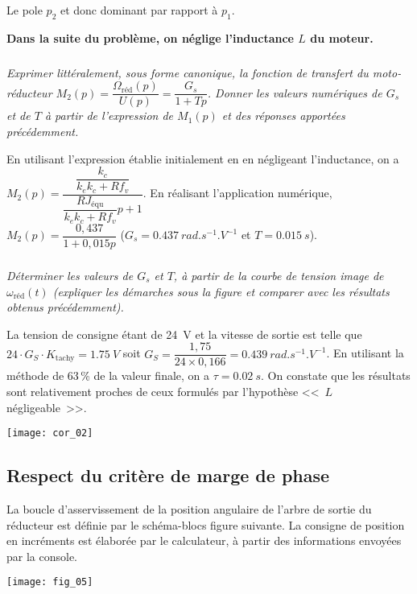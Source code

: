 \begin{multicols}{2}
\begin{corrige}
Le pole $p_2$ et donc dominant par rapport à $p_1$.
\end{corrige}
\else
\fi

\textbf{Dans la suite du problème, on néglige l’inductance $L$ du moteur.}

\subparagraph{}\textit{Exprimer littéralement, sous forme canonique, la fonction de transfert du moto-réducteur  $M_2(p)=\dfrac{\Omega_{\text{réd}}(p)}{U(p)}=\dfrac{G_s}{1+Tp}$.  
Donner les valeurs numériques de $G_s$ et de $T$ à partir de l’expression de $M_1(p)$ et des réponses apportées précédemment.}
\ifprof
\begin{corrige}
En utilisant l'expression établie initialement en en négligeant l'inductance, on a 
$  M_2(p)=\dfrac{\dfrac{k_c}{k_e k_c+Rf_v}}{  \dfrac{ RJ_{\text{équ}}  }{k_e k_c+Rf_v}p +1 }$.
En réalisant l'application numérique, $M_2(p)=\dfrac{0,437}{1+0,015p}$ 
($G_s = \SI{0,437}{rad.s^{-1}.V^{-1}}$ 
et $T=\SI{0,015}{s}$).
\end{corrige}
\else
\fi


\subparagraph{}\textit{Déterminer les valeurs de $G_s$ et $T$, à partir de la courbe de tension image de $\omega_{\text{réd}}(t)$  (expliquer les démarches sous la figure et comparer avec les résultats obtenus précédemment). }
\ifprof
\begin{corrige}
La tension de consigne étant de \SI{24}{V} et la vitesse de sortie est telle que  $24\cdot G_S \cdot K_{\text{tachy}}= \SI{1,75}{V}$ soit $G_S = \dfrac{1,75}{24\times 0,166} = \SI{0,439}{rad.s^{-1}.V^{-1}} $. En utilisant la méthode de 63\,\% de la valeur finale, on a $\tau = \SI{0,02}{s}$.
On constate que les résultats sont relativement proches de ceux formulés par l'hypothèse <<~$L$ négligeable~>>.
\end{corrige}
\begin{center}
\texttt{[image: cor\_02]}
\end{center}
\else
\fi

\subsection*{Respect du critère de marge de phase}
La boucle d’asservissement de la position angulaire de l’arbre de sortie du réducteur est définie par le schéma-blocs figure suivante. 
La consigne de position en incréments est élaborée par le  calculateur, à partir des informations envoyées par la console.

\begin{center}
\texttt{[image: fig\_05]}
\end{center}



\end{multicols}
